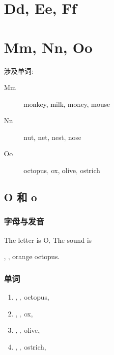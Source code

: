 



\chapter{Dd, Ee, Ff}






\chapter{Mm, Nn, Oo}

\noindent 涉及单词:

\begin{description}
  \item[Mm] monkey, milk, money, mouse
  \item[Nn] nut, net, nest, nose
  \item[Oo] octopus, ox, olive, ostrich
\end{description}



\section{O 和 o}

\subsection{字母与发音}

The letter is O, The sound is \jkipa{\textturnscripta}

\jkipa{\textturnscripta}, \jkipa{\textturnscripta}, orange octopus.

\subsection{单词}

\begin{enumerate}
  \item \jkipa{\textturnscripta}, \jkipa{\textturnscripta}, octopus, 
  \item \jkipa{\textturnscripta}, \jkipa{\textturnscripta}, ox, 
  \item \jkipa{\textturnscripta}, \jkipa{\textturnscripta}, olive, 
  \item \jkipa{\textturnscripta}, \jkipa{\textturnscripta}, ostrich, 
\end{enumerate}

